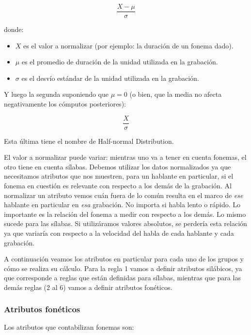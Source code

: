 \hspace{2cm} \[\frac{ X - \mu }{ \sigma }\]

\noindent donde:

\begin{itemize}
	\item $X$ es el valor a normalizar (por ejemplo: la duración de un fonema dado).
	\item $\mu$ es el promedio de duración de la unidad utilizada en la grabación.
	\item $\sigma$ es el desvío estándar de la unidad utilizada en la grabación.
\end{itemize}

\noindent Y luego la segunda suponiendo que $\mu = 0$ (o bien, que la media no afecta negativamente los cómputos posteriores):

\hspace{2cm} \[\frac{ X }{ \sigma }\]

\noindent Esta última tiene el nombre de Half-normal Distribution.

El valor a normalizar puede variar: mientras uno va a tener en cuenta fonemas, el otro tiene en cuenta sílabas. Debemos utilizar los datos normalizados ya que necesitamos atributos que nos muestren, para un hablante en particular, si el fonema en cuestión es relevante con respecto a los demás de la grabación. Al normalizar un atributo vemos cuán fuera de lo común resulta en el marco de \textit{ese} hablante en particular en \textit{esa} grabación. No importa si habla lento o rápido. Lo importante es la relación del fonema a medir con respecto a los demás. Lo mismo sucede para las sílabas. Si utilizáramos valores absolutos, se perdería esta relación ya que variaría con respecto a la velocidad del habla de cada hablante y cada grabación.
 
A continuación veamos los atributos en particular para cada uno de los grupos y cómo se realiza su cálculo. Para la regla 1 vamos a definir atributos silábicos, ya que corresponde a reglas que están definidas para sílabas, mientras que para las demás reglas (2 al 6) vamos a definir atributos fonéticos.

\subsubsection{Atributos fonéticos}

Los atributos que contabilizan fonemas son:

